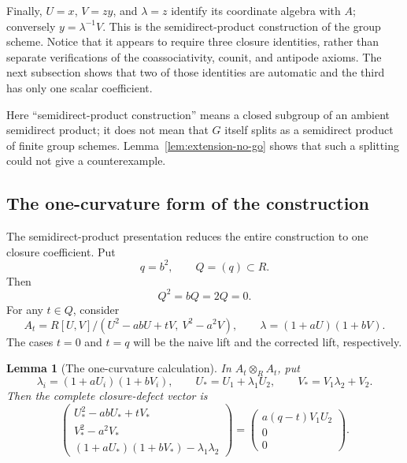 \documentclass[11pt]{amsart}
\newtheorem{lemma}[theorem]{Lemma}
\theoremstyle{definition}
\theoremstyle{remark}
\newcommand{\ot}{\otimes}
\begin{document}
Finally, \(U=x\), \(V=zy\), and \(\lambda=z\) identify its coordinate
algebra with \(A\); conversely \(y=\lambda^{-1}V\).  This is the
semidirect-product construction of the group scheme.  Notice that it
appears to require three closure identities, rather than separate
verifications of the coassociativity, counit, and antipode axioms.  The
next subsection shows that two of those identities are automatic and
the third has only one scalar coefficient.

Here ``semidirect-product construction'' means a closed subgroup of an
ambient semidirect product; it does not mean that \(G\) itself splits as
a semidirect product of finite group schemes.  Lemma~\ref{lem:extension-no-go}
shows that such a splitting could not give a counterexample.

\subsection{The one-curvature form of the construction}
\label{subsec:one-curvature}

The semidirect-product presentation reduces the entire construction to
one closure coefficient.  Put
\[
 q=b^2,\qquad Q=(q)\subset R.
\]
Then
\[
 Q^2=bQ=2Q=0.
\]
For any \(t\in Q\), consider
\begin{equation}\label{eq:At}
 A_t=
 R[U,V]/(U^2-abU+tV,\ V^2-a^2V),
 \qquad
 \lambda=(1+aU)(1+bV).
\end{equation}
The cases \(t=0\) and \(t=q\) will be the naive lift and the corrected
lift, respectively.

\begin{lemma}[The one-curvature calculation]\label{lem:one-curvature}
In \(A_t\ot_R A_t\), put
\[
 \lambda_i=(1+aU_i)(1+bV_i),\qquad
 U_*=U_1+\lambda_1U_2,\qquad
 V_*=V_1\lambda_2+V_2.
\]
Then the complete closure-defect vector is
\begin{equation}\label{eq:one-curvature-vector}
 \begin{pmatrix}
  U_*^2-abU_*+tV_*\\
  V_*^2-a^2V_*\\
  (1+aU_*)(1+bV_*)-\lambda_1\lambda_2
 \end{pmatrix}
 =
 \begin{pmatrix}
  a(q-t)V_1U_2\\0\\0
 \end{pmatrix}.
\end{equation}
\end{lemma}
\end{document}
